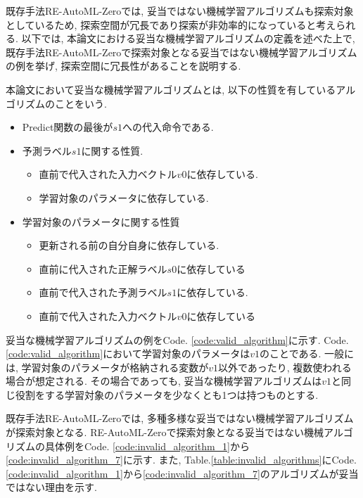 \documentclass[11pt,oneside,openany,report]{jsbook}
\begin{document}
既存手法RE-AutoML-Zeroでは, 妥当ではない機械学習アルゴリズムも探索対象としているため, 探索空間が冗長であり探索が非効率的になっていると考えられる. 以下では, 本論文における妥当な機械学習アルゴリズムの定義を述べた上で, 既存手法RE-AutoML-Zeroで探索対象となる妥当ではない機械学習アルゴリズムの例を挙げ, 探索空間に冗長性があることを説明する.

本論文において妥当な機械学習アルゴリズムとは, 以下の性質を有しているアルゴリズムのことをいう.

\begin{itemize}
  \item Predict関数の最後が$s1$への代入命令である.
  \item 予測ラベル$s1$に関する性質.
        \begin{itemize}
          \item 直前で代入された入力ベクトル$v0$に依存している.
          \item 学習対象のパラメータに依存している.
        \end{itemize}
  \item 学習対象のパラメータに関する性質
        \begin{itemize}
          \item 更新される前の自分自身に依存している.
          \item 直前に代入された正解ラベル$s0$に依存している
          \item 直前で代入された予測ラベル$s1$に依存している.
          \item 直前で代入された入力ベクトル$v0$に依存している
        \end{itemize}
\end{itemize}

\noindent
妥当な機械学習アルゴリズムの例をCode. \ref{code:valid_algorithm}に示す. Code. \ref{code:valid_algorithm}において学習対象のパラメータは$v1$のことである. 一般には, 学習対象のパラメータが格納される変数が$v1$以外であったり, 複数使われる場合が想定される. その場合であっても, 妥当な機械学習アルゴリズムは$v1$と同じ役割をする学習対象のパラメータを少なくとも1つは持つものとする.

既存手法RE-AutoML-Zeroでは, 多種多様な妥当ではない機械学習アルゴリズムが探索対象となる. RE-AutoML-Zeroで探索対象となる妥当ではない機械アルゴリズムの具体例をCode. \ref{code:invalid_algorithm_1}から\ref{code:invalid_algorithm_7}に示す. また, Table.\ref{table:invalid_algorithms}にCode. \ref{code:invalid_algorithm_1}から\ref{code:invalid_algorithm_7}のアルゴリズムが妥当ではない理由を示す.
\end{document}
